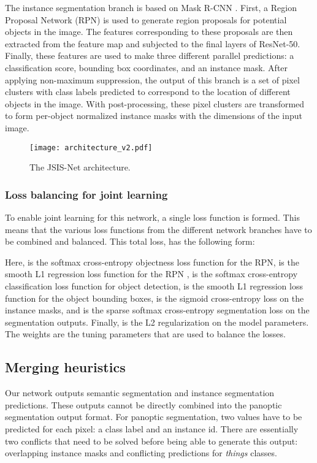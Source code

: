 \documentclass[10pt,twocolumn,letterpaper]{article}
\begin{document}
The instance segmentation branch is based on Mask R-CNN \cite{He2017}. First, a Region Proposal Network (RPN) is used to generate region proposals for potential objects in the image. The features corresponding to these proposals are then extracted from the feature map and subjected to the final layers of ResNet-50. Finally, these features are used to make three different parallel predictions: a classification score, bounding box coordinates, and an instance mask. After applying non-maximum suppression, the output of this branch is a set of pixel clusters with class labels predicted to correspond to the location of different objects in the image. With post-processing, these pixel clusters are transformed to form per-object normalized instance masks with the dimensions of the input image.

\begin{figure}[t]
\centering
\texttt{[image: architecture\_v2.pdf]}
\caption{The JSIS-Net architecture.}
\label{fig:architecture}
\end{figure}

\subsubsection{Loss balancing for joint learning} 
To enable joint learning for this network, a single loss function is formed. This means that the various loss functions from the different network branches have to be combined and balanced. This total loss,  has the following form:




Here,  is the softmax cross-entropy objectness loss function for the RPN,  is the smooth L1 regression loss function for the RPN \cite{Girshick2015},  is the softmax cross-entropy classification loss function for object detection,  is the smooth L1 regression loss function for the object bounding boxes,  is the sigmoid cross-entropy loss on the instance masks, and  is the sparse softmax cross-entropy segmentation loss on the segmentation outputs. Finally,  is the L2 regularization on the model parameters. The weights  are the  tuning parameters that are used to balance the losses.


\subsection{Merging heuristics}
\label{sec:heuristics}
Our network outputs semantic segmentation and instance segmentation predictions. These outputs cannot be directly combined into the panoptic segmentation output format. For panoptic segmentation, two values have to be predicted for each pixel: a class label and an instance id. There are essentially two conflicts that need to be solved before being able to generate this output: overlapping instance masks and conflicting predictions for \textit{things} classes.
\end{document}
